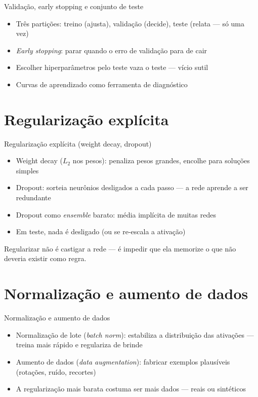 \documentclass[aspectratio=169, 11pt]{beamer}
\begin{document}
\begin{frame}{Validação, early stopping e conjunto de teste}
  \begin{itemize}\setlength{\itemsep}{0.4ex}
    \item Três partições: treino (ajusta), validação (decide), teste (relata
          — só uma vez)
    \item \emph{Early stopping}: parar quando o erro de validação para de cair
    \item Escolher hiperparâmetros pelo teste vaza o teste — vício sutil
    \item Curvas de aprendizado como ferramenta de diagnóstico
  \end{itemize}
\end{frame}

\section{Regularização explícita}

\begin{frame}{Regularização explícita (weight decay, dropout)}
  \begin{itemize}\setlength{\itemsep}{0.4ex}
    \item Weight decay ($L_2$ nos pesos): penaliza pesos grandes, encolhe para
          soluções simples
    \item Dropout: sorteia neurônios desligados a cada passo — a rede aprende a
          ser redundante
    \item Dropout como \emph{ensemble} barato: média implícita de muitas redes
    \item Em teste, nada é desligado (ou se re-escala a ativação)
  \end{itemize}
  \begin{ideiabox}
    Regularizar não é castigar a rede — é impedir que ela memorize o que não
    deveria existir como regra.
  \end{ideiabox}
\end{frame}

\section{Normalização e aumento de dados}

\begin{frame}{Normalização e aumento de dados}
  \begin{itemize}\setlength{\itemsep}{0.4ex}
    \item Normalização de lote (\emph{batch norm}): estabiliza a distribuição
          das ativações — treina mais rápido e regulariza de brinde
    \item Aumento de dados (\emph{data augmentation}): fabricar exemplos
          plausíveis (rotações, ruído, recortes)
    \item A regularização mais barata costuma ser mais dados — reais ou
          sintéticos
  \end{itemize}
\end{frame}
\end{document}
